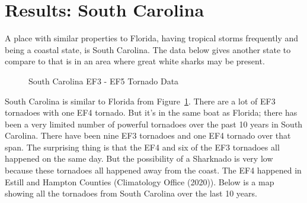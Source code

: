 \documentclass[
  letterpaper,
  DIV=11,
  numbers=noendperiod]{scrreprt}
\begin{document}
\section{Results: South Carolina}\label{results-south-carolina}

A place with similar properties to Florida, having tropical storms
frequently and being a coastal state, is South Carolina. The data below
gives another state to compare to that is in an area where great white
sharks may be present.

\begin{figure}


\caption{\label{fig-table2}South Carolina EF3 - EF5 Tornado Data}

\end{figure}%

South Carolina is similar to Florida from Figure~\ref{fig-table2}. There
are a lot of EF3 tornadoes with one EF4 tornado. But it's in the same
boat as Florida; there has been a very limited number of powerful
tornadoes over the past 10 years in South Carolina. There have been nine
EF3 tornadoes and one EF4 tornado over that span. The surprising thing
is that the EF4 and six of the EF3 tornadoes all happened on the same
day. But the possibility of a Sharknado is very low because these
tornadoes all happened away from the coast. The EF4 happened in Estill
and Hampton Counties (Climatology Office (2020)). Below is a map showing
all the tornadoes from South Carolina over the last 10 years.
\end{document}
